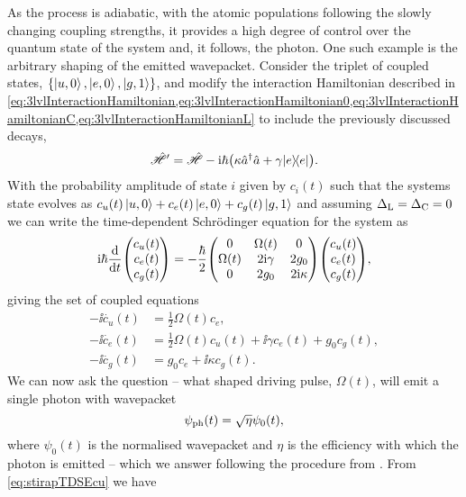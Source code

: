 \documentclass[../Thesis-IJspeert.tex]{subfiles}
\begin{document}
As the process is adiabatic, with the atomic populations following the slowly changing coupling strengths, it provides a high degree of control over the quantum state of the system and, it follows, the photon.  One such example is the arbitrary shaping of the emitted wavepacket.  Consider the triplet of coupled states, $\{\ket{u,0},\ket{e,0},\ket{g,1}\}$, and modify the interaction Hamiltonian described in \cref{eq:3lvlInteractionHamiltonian,eq:3lvlInteractionHamiltonian0,eq:3lvlInteractionHamiltonianC,eq:3lvlInteractionHamiltonianL} to include the previously discussed decays,
\begin{equation}
	\Ham\dash = \Ham - \ii\hbar \left( \kappa \creop\annop + \gamma \ketbra{e}{e} \right).
	\label{eq:stirapInteractionHamiltonian}
\end{equation}
With the probability amplitude of state $i$ given by $c_i(t)$ such that the systems state evolves as $c_u(t)\ket{u,0} + c_e(t)\ket{e,0} + c_g(t)\ket{g,1}$ and assuming $\Delta_{\mathrm{L}}=\Delta_{\mathrm{C}}=0$ we can write the time-dependent Schr{\"o}dinger equation for the system as
\begin{equation}
	  \ii\hbar \frac{\diffd}{\diffd t} \mqty(c_u(t) \\ c_e(t) \\ c_g(t)) = -\frac{\hbar}{2} \mqty(0 & \Omega(t) & 0 \\ \Omega(t) & 2\ii\gamma & 2g_0 \\ 0 & 2g_0 & 2\ii\kappa) \mqty(c_u(t) \\ c_e(t) \\ c_g(t)),
	\label{eq:stirapTDSE}
\end{equation}
giving the set of coupled equations
\begin{align}
	-\ii \dot{c_u}(t) &= \frac{1}{2} \Omega(t) c_e, \label{eq:stirapTDSEcu}\\
	-\ii \dot{c_e}(t) &= \frac{1}{2}\Omega(t)c_u(t) + \ii\gamma c_e(t) + g_0 c_g(t), \label{eq:stirapTDSEce}\\
	-\ii \dot{c_g}(t) &= g_0 c_e + \ii\kappa c_g(t). \label{eq:stirapTDSEcg}
\end{align}
We can now ask the question -- what shaped driving pulse, $\Omega(t)$, will emit a single photon with wavepacket
\begin{equation}
	\psi_{\mathrm{ph}}(t) = \sqrt{\eta}\psi_0(t),
	\label{eq:stirapTargetWavepacket}
\end{equation}
where $\psi_0(t)$ is the normalised wavepacket and $\eta$ is the efficiency with which the photon is emitted -- which we answer following the procedure from \cite{kuhn09}.  From \cref{eq:stirapTDSEcu} we have
\end{document}
